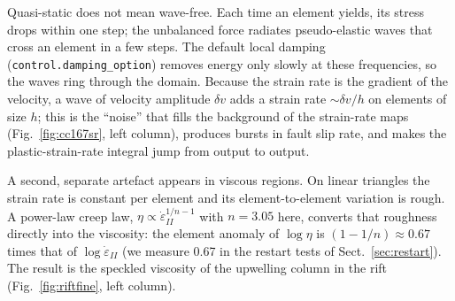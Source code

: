 \documentclass[11pt]{article}
\newcommand{\edot}{\dot\varepsilon_{II}}
\newcommand{\code}[1]{\texttt{#1}}
\begin{document}
Quasi-static does not mean wave-free. Each time an element yields, its stress drops within one
step; the unbalanced force radiates pseudo-elastic waves that cross an element in a few steps. The
default local damping (\code{control.damping\_option}) removes energy only slowly at these
frequencies, so the waves ring through the domain. Because the strain rate is the gradient of the
velocity, a wave of velocity amplitude $\delta v$ adds a strain rate $\sim\delta v/h$ on elements of
size $h$; this is the ``noise'' that fills the background of the strain-rate maps
(Fig.~\ref{fig:cc167sr}, left column), produces bursts in fault slip rate, and makes the
plastic-strain-rate integral jump from output to output.

A second, separate artefact appears in viscous regions. On linear triangles the strain rate is
constant per element and its element-to-element variation is rough. A power-law creep law,
$\eta\propto\edot^{1/n-1}$ with $n=3.05$ here, converts that roughness directly into the
viscosity: the element anomaly of $\log\eta$ is $(1-1/n)\approx0.67$ times that of $\log\edot$
(we measure 0.67 in the restart tests of Sect.~\ref{sec:restart}). The result is the speckled
viscosity of the upwelling column in the rift (Fig.~\ref{fig:riftfine}, left column).
\end{document}
